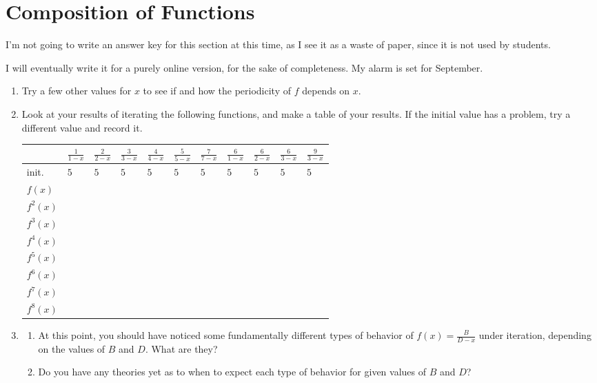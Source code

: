 \documentclass[../gatm_answers.tex]{subfiles}
\begin{document}
\section{Composition of Functions}

I'm not going to write an answer key for this section at this time, as I see it as a waste of paper, since it is not used by students.

I will eventually write it for a purely online version, for the sake of completeness. My alarm is set for September.

\iffalse
\begin{enumerate}
\setcounter{enumi}{\value{problem_i}}
\item Try a few other values for $x$ to see if and how the periodicity of $f$ depends on $x$.
\item Look at your results of iterating the following functions, and make a table of your results. If the initial value has a problem, try a different value and record it.
\begin{center}
\renewcommand*{\arraystretch}{1.4}
\begin{tabular}{|l|l|l|l|l|l|l|l|l|l|l|}
\hline
         & $\frac{1}{1-x}$ & $\frac{2}{2-x}$ & $\frac{3}{3-x}$ & $\frac{4}{4-x}$ & $\frac{5}{5-x}$ & $\frac{7}{7-x}$ & $\frac{6}{1-x}$ & $\frac{6}{2-x}$ & $\frac{6}{3-x}$ & $\frac{9}{3-x}$ \\ \hline
init.    & $5$   & $5$   & $5$ & $5$ & $5$ & $5$ & $5$ & $5$ & $5$ & $5$ \\ \hline
$f(x)$   &       &       &   &   &   &   &   &   &   &   \\ \hline
$f^2(x)$ &       &       &   &   &   &   &   &   &   &   \\ \hline
$f^3(x)$ &       &       &   &   &   &   &   &   &   &   \\ \hline
$f^4(x)$ &       &       &   &   &   &   &   &   &   &   \\ \hline
$f^5(x)$ &       &       &   &   &   &   &   &   &   &   \\ \hline
$f^6(x)$ &       &       &   &   &   &   &   &   &   &   \\ \hline
$f^7(x)$ &       &       &   &   &   &   &   &   &   &   \\ \hline
$f^8(x)$ &       &       &   &   &   &   &   &   &   &   \\ \hline
\end{tabular}
\end{center}
\item \begin{enumerate}
\item At this point, you should have noticed some fundamentally different types of behavior of $f(x)=\frac{B}{D-x}$ under iteration, depending on the values of $B$ and $D$. What are they?
\item Do you have any theories yet as to when to expect each type of behavior for given values of $B$ and $D$?
\end{enumerate}
\setcounter{problem_i}{\value{enumi}}
\end{enumerate}
\end{document}
